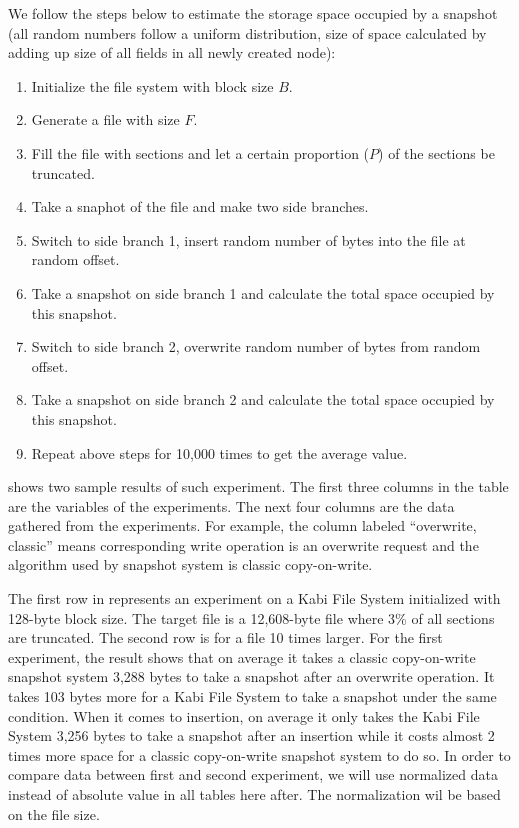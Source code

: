     We follow the steps below to estimate the storage space occupied by a snapshot (all random numbers follow a uniform distribution, size of space calculated by adding up size of all fields in all newly created node):

\begin{enumerate}

	\item Initialize the file system with block size $B$.

	\item Generate a file with size $F$.

	\item Fill the file with sections and let a certain proportion ($P$) of the sections be truncated.

	\item Take a snaphot of the file and make two side branches.
	
	\item Switch to side branch 1, insert random number of bytes into the file at random offset.

	\item Take a snapshot on side branch 1 and calculate the total space occupied by this snapshot.

	\item Switch to side branch 2, overwrite random number of bytes from random offset.

	\item Take a snapshot on side branch 2 and calculate the total space occupied by this snapshot.

	\item Repeat above steps for 10,000 times to get the average value.

\end{enumerate}

     shows two sample results of such experiment. The first three columns in the table are the variables of the experiments. The next four columns are the data gathered from the experiments. For example, the column labeled ``overwrite, classic'' means corresponding write operation is an overwrite request and the algorithm used by snapshot system is classic copy-on-write.

    The first row in  represents an experiment on a Kabi File System initialized with 128-byte block size. The target file is a 12,608-byte file where 3\% of all sections are truncated. The second row is for a file 10 times larger. For the first experiment, the result shows that on average it takes a classic copy-on-write snapshot system 3,288 bytes to take a snapshot after an overwrite operation. It takes 103 bytes more for a Kabi File System to take a snapshot under the same condition. When it comes to insertion, on average it only takes the Kabi File System 3,256 bytes to take a snapshot after an insertion while it costs almost 2 times more space for a classic copy-on-write snapshot system to do so. In order to compare data between first and second experiment, we will use normalized data instead of absolute value in all tables here after. The normalization wil be based on the file size.

